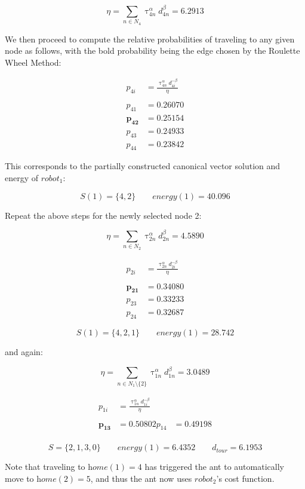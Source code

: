 \documentclass[a4paper]{article}
\begin{document}
$$
\eta = \sum_{n \in N_4} \uptau_{4n}^\alpha d_{4n}^\beta = 6.2913
$$

We then proceed to compute the relative probabilities of traveling to any given node as follows, with the bold probability being the edge chosen by the Roulette Wheel Method:

\begin{align*}
p_{4i} &= \frac{\uptau_{4n}^\alpha d_{4i}^{-\beta}}{\eta} \\
\\
p_{41} &= 0.26070 \\
\mathbf{p_{42}} &= \mathbf{0.25154} \\
p_{43} &= 0.24933 \\
p_{44} &= 0.23842
\end{align*}

This corresponds to the partially constructed canonical vector solution and energy of $robot_1$: 

$$
S(1) = \{4, 2\} \qquad \mathit{energy}(1) = 40.096
$$


Repeat the above steps for the newly selected node 2:

$$
\eta = \sum_{n \in N_2} \uptau_{2n}^\alpha d_{2n}^\beta = 4.5890
$$

\begin{align*}
p_{2i} &= \frac{\uptau_{2n}^\alpha d_{2i}^{-\beta}}{\eta} \\
\\
\mathbf{p_{21}} &= \mathbf{0.34080} \\
p_{23} &= 0.33233 \\
p_{24} &= 0.32687
\end{align*}

$$
S(1) = \{4, 2, 1\} \qquad \mathit{energy}(1) = 28.742
$$

and again:

$$
\eta = \sum_{n \in N_1\setminus\{2\}} \uptau_{1n}^\alpha d_{1n}^\beta = 3.0489
$$

\begin{align*}
p_{1i} &= \frac{\uptau_{1n}^\alpha d_{1i}^{-\beta}}{\eta} \\
\\
\mathbf{p_{13}} &= \mathbf{0.50802}
p_{14} &= 0.49198 \\
\end{align*}

$$
S = \{2, 1, 3, 0\} \qquad \mathit{energy}(1) = 6.4352 \qquad d_{tour} = 6.1953
$$

Note that traveling to $\textit{home}(1) = 4$ has triggered the ant to automatically move to $\textit{home}(2) = 5$, and thus the ant now uses $robot_2$'s cost function.
\end{document}
